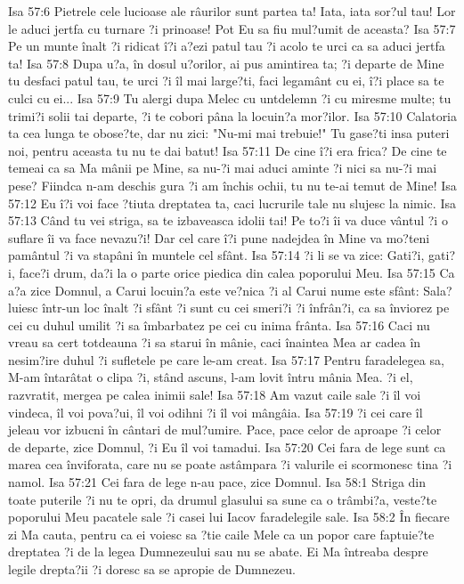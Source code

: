 Isa 57:6  Pietrele cele lucioase ale râurilor sunt partea ta! Iata, iata sor?ul tau! Lor le aduci jertfa cu turnare ?i prinoase! Pot Eu sa fiu mul?umit de aceasta?
Isa 57:7  Pe un munte înalt ?i ridicat î?i a?ezi patul tau ?i acolo te urci ca sa aduci jertfa ta!
Isa 57:8  Dupa u?a, în dosul u?orilor, ai pus amintirea ta; ?i departe de Mine tu desfaci patul tau, te urci ?i îl mai large?ti, faci legamânt cu ei, î?i place sa te culci cu ei...
Isa 57:9  Tu alergi dupa Melec cu untdelemn ?i cu miresme multe; tu trimi?i solii tai departe, ?i te cobori pâna la locuin?a mor?ilor.
Isa 57:10  Calatoria ta cea lunga te obose?te, dar nu zici: "Nu-mi mai trebuie!" Tu gase?ti insa puteri noi, pentru aceasta tu nu te dai batut!
Isa 57:11  De cine î?i era frica? De cine te temeai ca sa Ma mânii pe Mine, sa nu-?i mai aduci aminte ?i nici sa nu-?i mai pese? Fiindca n-am deschis gura ?i am închis ochii, tu nu te-ai temut de Mine!
Isa 57:12  Eu î?i voi face ?tiuta dreptatea ta, caci lucrurile tale nu slujesc la nimic.
Isa 57:13  Când tu vei striga, sa te izbaveasca idolii tai! Pe to?i îi va duce vântul ?i o suflare îi va face nevazu?i! Dar cel care î?i pune nadejdea în Mine va mo?teni pamântul ?i va stapâni în muntele cel sfânt.
Isa 57:14  ?i li se va zice: Gati?i, gati?i, face?i drum, da?i la o parte orice piedica din calea poporului Meu.
Isa 57:15  Ca a?a zice Domnul, a Carui locuin?a este ve?nica ?i al Carui nume este sfânt: Sala?luiesc într-un loc înalt ?i sfânt ?i sunt cu cei smeri?i ?i înfrân?i, ca sa înviorez pe cei cu duhul umilit ?i sa îmbarbatez pe cei cu inima frânta.
Isa 57:16  Caci nu vreau sa cert totdeauna ?i sa starui în mânie, caci înaintea Mea ar cadea în nesim?ire duhul ?i sufletele pe care le-am creat.
Isa 57:17  Pentru faradelegea sa, M-am întarâtat o clipa ?i, stând ascuns, l-am lovit întru mânia Mea. ?i el, razvratit, mergea pe calea inimii sale!
Isa 57:18  Am vazut caile sale ?i îl voi vindeca, îl voi pova?ui, îl voi odihni ?i îl voi mângâia.
Isa 57:19  ?i cei care îl jeleau vor izbucni în cântari de mul?umire. Pace, pace celor de aproape ?i celor de departe, zice Domnul, ?i Eu îl voi tamadui.
Isa 57:20  Cei fara de lege sunt ca marea cea înviforata, care nu se poate astâmpara ?i valurile ei scormonesc tina ?i namol.
Isa 57:21  Cei fara de lege n-au pace, zice Domnul.
Isa 58:1  Striga din toate puterile ?i nu te opri, da drumul glasului sa sune ca o trâmbi?a, veste?te poporului Meu pacatele sale ?i casei lui Iacov faradelegile sale.
Isa 58:2  În fiecare zi Ma cauta, pentru ca ei voiesc sa ?tie caile Mele ca un popor care faptuie?te dreptatea ?i de la legea Dumnezeului sau nu se abate. Ei Ma întreaba despre legile drepta?ii ?i doresc sa se apropie de Dumnezeu.
